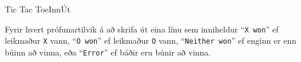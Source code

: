 \begin{problem}{Tic Tac Toe}{Inn}{Út}{~}{~}
	\Output

		Fyrir hvert prófunartilvik á að skrifa út eina línu sem inniheldur "`\texttt{X won}"' ef leikmaður \texttt{X} vann, "`\texttt{O won}"' ef leikmaður \texttt{O} vann, "`\texttt{Neither won}"' ef enginn er enn búinn að vinna, eða "`\texttt{Error}"' ef báðir eru búnir að vinna.

	\Examples

		\begin{example}
		\end{example}

\end{problem}